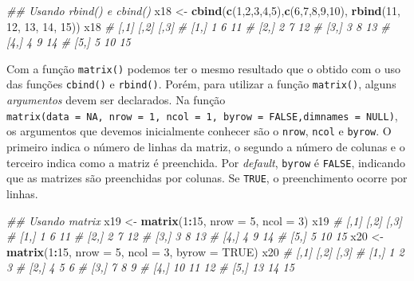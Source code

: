\documentclass[
]{book}
\makeatletter
\newenvironment{Shaded}{\begin{snugshade}}{\end{snugshade}}
\newcommand{\CommentTok}[1]{\textcolor[rgb]{0.56,0.35,0.01}{\textit{#1}}}
\newcommand{\DataTypeTok}[1]{\textcolor[rgb]{0.13,0.29,0.53}{#1}}
\newcommand{\DecValTok}[1]{\textcolor[rgb]{0.00,0.00,0.81}{#1}}
\newcommand{\KeywordTok}[1]{\textcolor[rgb]{0.13,0.29,0.53}{\textbf{#1}}}
\newcommand{\NormalTok}[1]{#1}
\newcommand{\OperatorTok}[1]{\textcolor[rgb]{0.81,0.36,0.00}{\textbf{#1}}}
\newcommand{\OtherTok}[1]{\textcolor[rgb]{0.56,0.35,0.01}{#1}}
\newcommand{\StringTok}[1]{\textcolor[rgb]{0.31,0.60,0.02}{#1}}
\numberwithin{equation}{section}
\newcommand{\indf}[1]{\index[function]{#1@\texttt{#1()}|ST}}
\makeatother
\begin{document}
\begin{Shaded}
\begin{Highlighting}[]
\CommentTok{\#\# Usando rbind() e cbind()}
\NormalTok{x18 \textless{}{-}}\StringTok{ }\KeywordTok{cbind}\NormalTok{(}\KeywordTok{c}\NormalTok{(}\DecValTok{1}\NormalTok{,}\DecValTok{2}\NormalTok{,}\DecValTok{3}\NormalTok{,}\DecValTok{4}\NormalTok{,}\DecValTok{5}\NormalTok{),}\KeywordTok{c}\NormalTok{(}\DecValTok{6}\NormalTok{,}\DecValTok{7}\NormalTok{,}\DecValTok{8}\NormalTok{,}\DecValTok{9}\NormalTok{,}\DecValTok{10}\NormalTok{), }\KeywordTok{rbind}\NormalTok{(}\DecValTok{11}\NormalTok{, }\DecValTok{12}\NormalTok{, }\DecValTok{13}\NormalTok{, }\DecValTok{14}\NormalTok{, }\DecValTok{15}\NormalTok{))  }
\NormalTok{x18}
\CommentTok{\#      [,1] [,2] [,3]}
\CommentTok{\# [1,]    1    6   11}
\CommentTok{\# [2,]    2    7   12}
\CommentTok{\# [3,]    3    8   13}
\CommentTok{\# [4,]    4    9   14}
\CommentTok{\# [5,]    5   10   15}
\end{Highlighting}
\end{Shaded}

Com a função \texttt{matrix()} \indf{matrix} podemos ter o mesmo resultado que o obtido com o uso das funções \texttt{cbind()} e \texttt{rbind()}. Porém, para utilizar a função \texttt{matrix()}, alguns \emph{argumentos} devem ser declarados. Na função \texttt{matrix(data\ =\ NA,\ nrow\ =\ 1,\ ncol\ =\ 1,\ byrow\ =\ FALSE,dimnames\ =\ NULL)}, os argumentos que devemos inicialmente conhecer são o \texttt{nrow}, \texttt{ncol} e \texttt{byrow}. O primeiro indica o número de linhas da matriz, o segundo a número de colunas e o terceiro indica como a matriz é preenchida. Por \emph{default}, \texttt{byrow} é \texttt{FALSE}, indicando que as matrizes são preenchidas por colunas. Se \texttt{TRUE}, o preenchimento ocorre por linhas.

\begin{Shaded}
\begin{Highlighting}[]
\CommentTok{\#\# Usando matrix}
\NormalTok{x19 \textless{}{-}}\StringTok{ }\KeywordTok{matrix}\NormalTok{(}\DecValTok{1}\OperatorTok{:}\DecValTok{15}\NormalTok{, }\DataTypeTok{nrow =} \DecValTok{5}\NormalTok{, }\DataTypeTok{ncol =} \DecValTok{3}\NormalTok{)}
\NormalTok{x19}
\CommentTok{\#      [,1] [,2] [,3]}
\CommentTok{\# [1,]    1    6   11}
\CommentTok{\# [2,]    2    7   12}
\CommentTok{\# [3,]    3    8   13}
\CommentTok{\# [4,]    4    9   14}
\CommentTok{\# [5,]    5   10   15}
\NormalTok{x20 \textless{}{-}}\StringTok{ }\KeywordTok{matrix}\NormalTok{(}\DecValTok{1}\OperatorTok{:}\DecValTok{15}\NormalTok{, }\DataTypeTok{nrow =} \DecValTok{5}\NormalTok{, }\DataTypeTok{ncol =} \DecValTok{3}\NormalTok{, }\DataTypeTok{byrow =} \OtherTok{TRUE}\NormalTok{)}
\NormalTok{x20}
\CommentTok{\#      [,1] [,2] [,3]}
\CommentTok{\# [1,]    1    2    3}
\CommentTok{\# [2,]    4    5    6}
\CommentTok{\# [3,]    7    8    9}
\CommentTok{\# [4,]   10   11   12}
\CommentTok{\# [5,]   13   14   15}
\end{Highlighting}
\end{Shaded}
\end{document}
